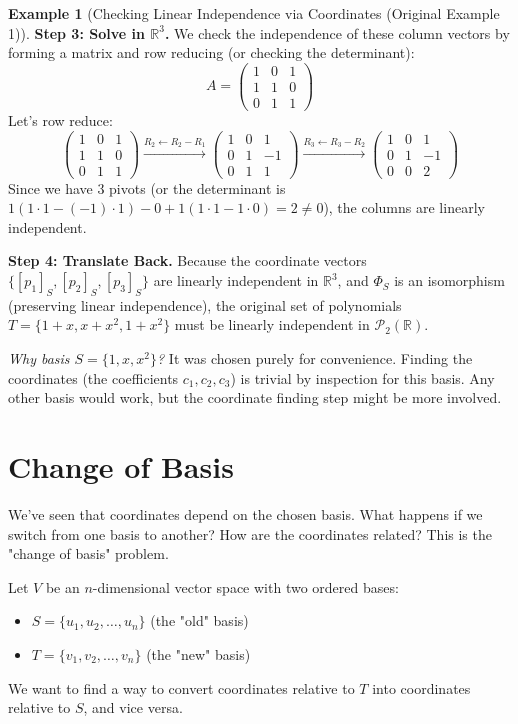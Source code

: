 \documentclass[11pt]{article}
\theoremstyle{definition}
\newtheorem{example}[theorem]{Example}
\theoremstyle{remark}
\newcommand{\R}{\mathbb{R}}
\newcommand{\Poly}[1]{\mathcal{P}_{#1}} %
\newcommand{\Rn}[1]{\R^{#1}}
\newcommand{\coord}[2]{[#1]_{#2}} %
\begin{document}
\begin{example}[Checking Linear Independence via Coordinates (Original Example 1)]
    \textbf{Step 3: Solve in $\Rn{3}$.}
    We check the independence of these column vectors by forming a matrix and row reducing (or checking the determinant):
    \[ A = \begin{pmatrix} 1 & 0 & 1 \\ 1 & 1 & 0 \\ 0 & 1 & 1 \end{pmatrix} \]
    Let's row reduce:
    \[ \begin{pmatrix} 1 & 0 & 1 \\ 1 & 1 & 0 \\ 0 & 1 & 1 \end{pmatrix} \xrightarrow{R_2 \leftarrow R_2 - R_1} \begin{pmatrix} 1 & 0 & 1 \\ 0 & 1 & -1 \\ 0 & 1 & 1 \end{pmatrix} \xrightarrow{R_3 \leftarrow R_3 - R_2} \begin{pmatrix} 1 & 0 & 1 \\ 0 & 1 & -1 \\ 0 & 0 & 2 \end{pmatrix} \]
    Since we have 3 pivots (or the determinant is $1(1\cdot 1 - (-1)\cdot 1) - 0 + 1(1\cdot 1 - 1\cdot 0) = 2 \neq 0$), the columns are linearly independent.

    \textbf{Step 4: Translate Back.}
    Because the coordinate vectors $\{\coord{p_1}{S}, \coord{p_2}{S}, \coord{p_3}{S}\}$ are linearly independent in $\Rn{3}$, and $\Phi_S$ is an isomorphism (preserving linear independence), the original set of polynomials $T = \{1+x, x+x^2, 1+x^2\}$ must be linearly independent in $\Poly{2}(\R)$.

    \textit{Why basis $S=\{1,x,x^2\}$?} It was chosen purely for convenience. Finding the coordinates (the coefficients $c_1, c_2, c_3$) is trivial by inspection for this basis. Any other basis would work, but the coordinate finding step might be more involved.
\end{example}

\section{Change of Basis}

We've seen that coordinates depend on the chosen basis. What happens if we switch from one basis to another? How are the coordinates related? This is the "change of basis" problem.

Let $V$ be an $n$-dimensional vector space with two ordered bases:
\begin{itemize}
    \item $S = \{u_1, u_2, \dots, u_n\}$ (the "old" basis)
    \item $T = \{v_1, v_2, \dots, v_n\}$ (the "new" basis)
\end{itemize}
We want to find a way to convert coordinates relative to $T$ into coordinates relative to $S$, and vice versa.
\end{document}
